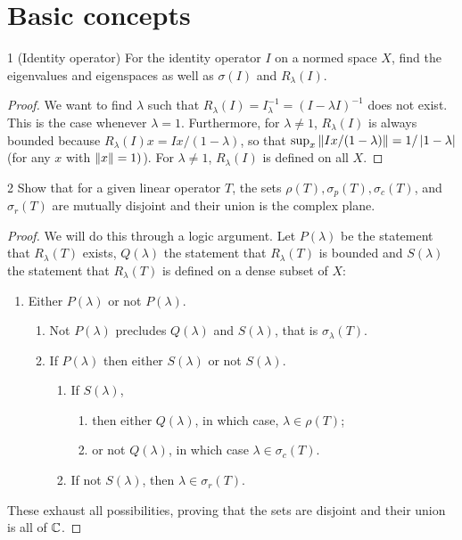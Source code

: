\section{Basic concepts}


\begin{exercise}{1 (Identity operator)}
For the identity operator $I$ on a normed space $X$, find the eigenvalues and eigenspaces as well as $\sigma (I)$ and $R_\lambda(I)$.
\end{exercise}
\begin{proof}
We want to find $\lambda$ such that $R_\lambda(I) = I_\lambda^{-1} = (I - \lambda I)^{-1}$ does not exist.
This is the case whenever $\lambda = 1$.
Furthermore, for $\lambda \neq 1$, $R_\lambda(I)$ is always bounded because $R_\lambda(I)x = Ix / (1 - \lambda)$, so that $\sup_x \left\lVert Ix / (1 - \lambda)\right\rVert = 1 / \left\lvert 1 - \lambda\right\rvert$ (for any $x$ with $\left\lVert x\right\rVert = 1)$).
For $\lambda \neq 1$, $R_\lambda(I)$ is defined on all $X$.
\end{proof} 

\begin{exercise}{2}
Show that for a given linear operator $T$, the sets $\rho(T), \sigma_p(T), \sigma_c(T)$, and $\sigma_r(T)$ are mutually disjoint and their union is the complex plane.
\end{exercise}
\begin{proof}
We will do this through a logic argument.
Let $P(\lambda)$ be the statement that $R_\lambda(T)$ exists, $Q(\lambda)$ the statement that $R_\lambda(T)$ is bounded and $S(\lambda)$ the statement that $R_\lambda(T)$ is defined on a dense subset of $X$:
\begin{enumerate}
    \item Either $P(\lambda)$ or not $P(\lambda)$.
    \begin{enumerate}
        \item Not $P(\lambda)$ precludes $Q(\lambda)$ and $S(\lambda)$, that is $\sigma_\lambda(T)$.
        \item If $P(\lambda)$ then either $S(\lambda)$ or not $S(\lambda)$.
        \begin{enumerate}
            \item If $S(\lambda)$,
            \begin{enumerate}
                \item then either $Q(\lambda)$, in which case, $\lambda \in \rho(T)$;
                \item or not $Q(\lambda)$, in which case $\lambda \in \sigma_c(T)$.
            \end{enumerate}
            \item If not $S(\lambda)$, then $\lambda \in \sigma_r(T)$.
        \end{enumerate}
    \end{enumerate}
\end{enumerate}
These exhaust all possibilities, proving that the sets are disjoint and their union is all of $\mathbb{C}$.
\end{proof} 

